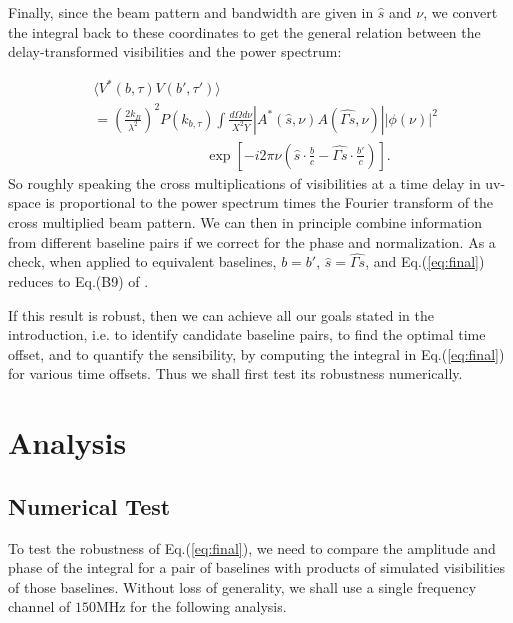\documentclass[preprint2,numberedappendix,tighten,twocolappendix]{aastex6}  %
\renewcommand\[{\begin{equation}}
\renewcommand\]{\end{equation}}
\begin{document}
Finally, since the beam pattern and bandwidth are given in $\hat{s}$
and $\nu$, we convert the integral back to these coordinates to get
the general relation between the delay-transformed visibilities and
the power spectrum:

\begin{equation}
\boxed{\begin{aligned} & \langle V^{*}(b,\tau)V(b',\tau')\rangle\\
 & =\left(\frac{2k_{B}}{\lambda^{2}}\right)^{2}P(k_{b,\tau})\int\frac{d\Omega d\nu}{X^{2}Y}|A^{*}(\hat{s},\nu)A(\hat{\Gamma s},\nu)||\phi(\nu)|^{2}\\
 & \qquad \qquad \qquad \qquad \exp\left[-i2\pi\nu\left(\hat{s}\cdot\frac{b}{c}-\hat{\Gamma s}\cdot\frac{b'}{c}\right)\right].\end{aligned}}
\label{eq:final}
\end{equation}
So roughly speaking the cross multiplications of visibilities at a time delay
in uv-space is proportional to the power spectrum times the Fourier
transform of the cross multiplied beam pattern. We can then in principle
combine information from different baseline pairs if we correct for
the phase and normalization. As a check, when applied to equivalent baselines,
$b=b'$, $\hat{s}=\hat{\Gamma s}$, and Eq.(\ref{eq:final}) reduces to Eq.(B9) of \cite{paper32}. 

If this result is robust, then we can achieve all our goals stated in the introduction, i.e. to identify 
candidate baseline pairs, to find the optimal time offset, and to quantify the sensibility, by computing the integral
in Eq.(\ref{eq:final}) for various time offsets. Thus we shall first test its robustness numerically.


\section{Analysis}
\subsection{Numerical Test \label{sec:Techniquet}}

To test the robustness of Eq.(\ref{eq:final}), we need to compare the amplitude and phase of the integral
for a pair of baselines with products of simulated visibilities of those baselines. Without loss of generality, we shall use a single frequency channel of $150$MHz for the following analysis. 
\end{document}
